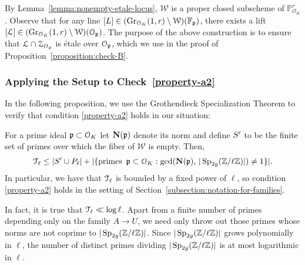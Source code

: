 \begin{remark}
	\label{remark:exists-line}
By Lemma~\ref{lemma:nonempty-etale-locus}, $\mathcal W$ is a proper closed subscheme of $\mathbb P^r_{\mathcal O_K}$.
	Observe that for any line $[L] \in (\operatorname{Gr}_{\mathcal O_K}(1,r) \setminus \mathcal W)(\mathbb F_\mathfrak p)$, there exists a lift $[\mathcal L] \in (\operatorname{Gr}_{\mathcal O_K}(1,r) \setminus \mathcal W)(\mathcal O_\mathfrak p)$.
The purpose of the above construction is to ensure that $\mathcal L \cap \mathcal Z_{\mathcal O_\mathfrak p}$ is \'etale over $\mathcal O_\mathfrak p$,
which we use in the proof of Proposition~\ref{proposition:check-B}.
\end{remark}

\subsubsection{Applying the Setup to Check~\ref{property-a2}}
In the following proposition, we use the Grothendieck Specialization Theorem to verify that condition \ref{property-a2} holds in our situation:
	\begin{proposition}	\label{proposition:check-B}
For a prime ideal $\mathfrak p \subset \mathcal O_K$ let $\mathbf{N}(\mathfrak p)$ denote its norm and define $S'$ to be the finite set of primes over which the fiber of $\mathcal W$ is empty. Then,
 		\begin{align*}
			\mathcal T_{\ell} \leq |S' \cup P_\ell| + |\{\mathrm{primes}\,\,\, \mathfrak p \subset \mathcal O_K : \gcd(\mathbf{N}(\mathfrak p),\, | \operatorname{Sp}_{2g}(\mathbb Z/ \ell \mathbb Z)|) \neq 1 \}|.
		\end{align*}
		In particular, we have that $\mathcal T_{\ell}$ is bounded by a fixed power of $\ell$, so condition \ref{property-a2} holds in the setting of Section~\ref{subsection:notation-for-families}.
	\end{proposition}
\begin{remark}
	\label{remark:}
	In fact, it is true that $\mathcal T_{\ell} \ll \log \ell$. Apart from a finite number of primes depending only on the family $A \rightarrow U$, we need only throw out those primes whose norms are not coprime to $|\operatorname{Sp}_{2g}(\mathbb Z/ \ell \mathbb Z)|$. Since $|\operatorname{Sp}_{2g}(\mathbb Z/ \ell \mathbb Z)|$ grows polynomially in $\ell$,
	the number of distinct primes dividing $|\operatorname{Sp}_{2g}(\mathbb Z/ \ell \mathbb Z)|$
	is at most logarithmic in $\ell$.
\end{remark}
